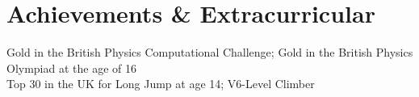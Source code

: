 \section{Achievements \& Extracurricular}
\begin{itemize}[leftmargin=0.15in, label={}]
\small{\item{
    {Gold in the British Physics Computational Challenge; Gold in the British Physics Olympiad at the age of 16}\\
    {Top 30 in the UK for Long Jump at age 14; V6-Level Climber}
}}
\end{itemize}